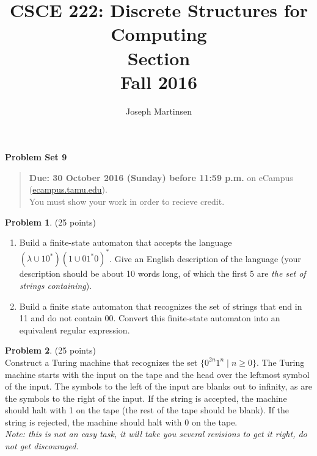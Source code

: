 \documentclass{article}
\title{CSCE 222: Discrete Structures for Computing\\Section \mysectionnumber\\Fall 2016}
\author{Joseph Martinsen}
\theoremstyle{definition}
\newtheorem{problem}{Problem}
\newtheorem*{solution}{Solution}
\newcommand{\problemset}[1]{\begin{center}\textbf{Problem Set #1}\end{center}}
\newcommand{\duedate}[1]{\begin{quote}\textbf{Due: #1} on eCampus (\url{ecampus.tamu.edu}). \\You must show your work in order to recieve credit.\end{quote}}
\begin{document}
\maketitle

\problemset{9}

\duedate{30 October 2016 (Sunday) before 11:59 p.m.}

\bigskip

\begin{problem} (25 points)\\
\begin{enumerate}
\item Build a finite-state automaton that accepts the language $(\lambda\cup 10^*)(1\cup01^*0)^*$.  Give an English description of the language (your description should be about 10 words long, of which the first 5 are \textit{the set of strings containing}).
\item Build a finite state automaton that recognizes the set of strings that end in 11 and do not contain 00. Convert this finite-state automaton into an equivalent regular expression.

\end{enumerate}
\end{problem}



\begin{problem} (25 points)\\
Construct a Turing machine that recognizes the set $\{0^{2n}1^n \mid n\geq 0\}$.  The Turing machine starts with the input on the tape and the head over the leftmost symbol of the input.  The symbols to the left of the input are blanks out to infinity, as are the symbols to the right of the input.  If the string is accepted, the machine should halt with 1 on the tape (the rest of the tape should be blank).  If the string is rejected, the machine should halt with 0 on the tape.\\
\textit{Note: this is not an easy task, it will take you several revisions to get it right, do not get discouraged.}
\end{problem}

\end{document}
